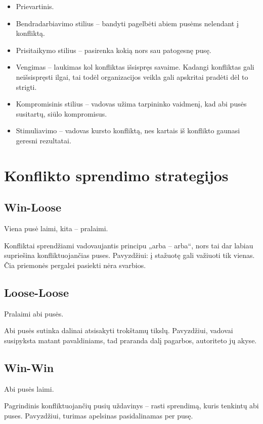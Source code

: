 \begin{itemize}
  \item Prievartinis.
  \item Bendradarbiavimo stilius – bandyti pagelbėti abiem pusėms
    nelendant į konfliktą.
  \item Prisitaikymo stilius – pasirenka kokią nors sau patogesnę
    pusę.
  \item Vengimas – laukimas kol konfliktas išsispręs savaime. Kadangi
    konfliktas gali neišsispręsti ilgai, tai todėl organizacijos veikla
    gali apskritai pradėti dėl to strigti.
  \item Kompromisinis stilius – vadovas užima tarpininko vaidmenį, kad
    abi pusės susitartų, siūlo kompromisus.
  \item Stimuliavimo – vadovas kursto konfliktą, nes kartais iš konflikto
    gaunasi geresni rezultatai.
\end{itemize}

\section{Konflikto sprendimo strategijos}

\subsection{Win-Loose}

Viena pusė laimi, kita – pralaimi.

Konfliktai sprendžiami vadovaujantis principu „arba – arba“, nors tai
dar labiau supriešina konfliktuojančias puses. Pavyzdžiui: į stažuotę
gali važiuoti tik vienas. Čia priemonės pergalei pasiekti nėra
svarbios.

\subsection{Loose-Loose}

Pralaimi abi pusės.

Abi pusės sutinka dalinai atsisakyti trokštamų tikslų. Pavyzdžiui, vadovai
susipyksta matant pavaldiniams, tad praranda dalį pagarbos, autoriteto
jų akyse.

\subsection{Win-Win}

Abi pusės laimi.

Pagrindinis konfliktuojančių pusių uždavinys – rasti sprendimą, kuris
tenkintų abi puses. Pavyzdžiui, turimas apelsinas pasidalinamas
per pusę.
